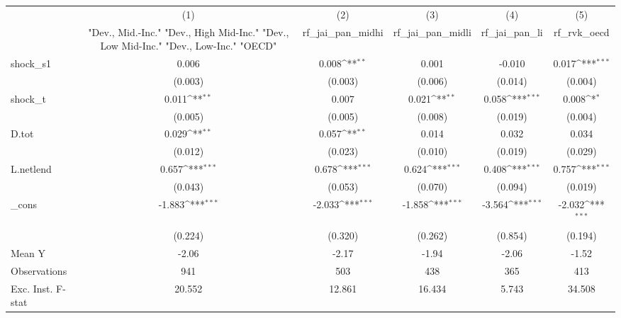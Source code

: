 {
\def\sym#1{\ifmmode^{#1}\else\(^{#1}\)\fi}
\begin{tabular}{l*{5}{c}}
\toprule
            &\multicolumn{1}{c}{(1)}&\multicolumn{1}{c}{(2)}&\multicolumn{1}{c}{(3)}&\multicolumn{1}{c}{(4)}&\multicolumn{1}{c}{(5)}\\
            &\multicolumn{1}{c}{ "Dev., Mid.-Inc." "Dev., High Mid-Inc." "Dev., Low Mid-Inc." "Dev., Low-Inc." "OECD" }&\multicolumn{1}{c}{rf\_jai\_pan\_midhi}&\multicolumn{1}{c}{rf\_jai\_pan\_midli}&\multicolumn{1}{c}{rf\_jai\_pan\_li}&\multicolumn{1}{c}{rf\_rvk\_oecd}\\
\midrule
shock\_s1    &       0.006         &       0.008\sym{**} &       0.001         &      -0.010         &       0.017\sym{***}\\
            &     (0.003)         &     (0.003)         &     (0.006)         &     (0.014)         &     (0.004)         \\
\addlinespace
shock\_t     &       0.011\sym{**} &       0.007         &       0.021\sym{**} &       0.058\sym{***}&       0.008\sym{*}  \\
            &     (0.005)         &     (0.005)         &     (0.008)         &     (0.019)         &     (0.004)         \\
\addlinespace
D.tot       &       0.029\sym{**} &       0.057\sym{**} &       0.014         &       0.032         &       0.034         \\
            &     (0.012)         &     (0.023)         &     (0.010)         &     (0.019)         &     (0.029)         \\
\addlinespace
L.netlend   &       0.657\sym{***}&       0.678\sym{***}&       0.624\sym{***}&       0.408\sym{***}&       0.757\sym{***}\\
            &     (0.043)         &     (0.053)         &     (0.070)         &     (0.094)         &     (0.019)         \\
\addlinespace
\_cons      &      -1.883\sym{***}&      -2.033\sym{***}&      -1.858\sym{***}&      -3.564\sym{***}&      -2.032\sym{***}\\
            &     (0.224)         &     (0.320)         &     (0.262)         &     (0.854)         &     (0.194)         \\
\midrule
Mean Y      &       -2.06         &       -2.17         &       -1.94         &       -2.06         &       -1.52         \\
Observations&         941         &         503         &         438         &         365         &         413         \\
Exc. Inst. F-stat&      20.552         &      12.861         &      16.434         &       5.743         &      34.508         \\
\bottomrule
\end{tabular}
}
